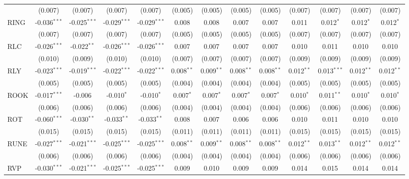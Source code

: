 \begin{table}[!htbp]
\begin{tabular}{@{\extracolsep{5pt}}lcccccccccccc}
  & (0.007) & (0.007) & (0.007) & (0.007) & (0.005) & (0.005) & (0.005) & (0.005) & (0.007) & (0.007) & (0.007) & (0.007) \\
 RING & -0.036$^{***}$ & -0.025$^{***}$ & -0.029$^{***}$ & -0.029$^{***}$ & 0.008$^{}$ & 0.008$^{}$ & 0.007$^{}$ & 0.007$^{}$ & 0.011$^{}$ & 0.012$^{*}$ & 0.012$^{*}$ & 0.012$^{*}$ \\
  & (0.007) & (0.007) & (0.007) & (0.007) & (0.005) & (0.005) & (0.005) & (0.005) & (0.007) & (0.007) & (0.007) & (0.007) \\
 RLC & -0.026$^{***}$ & -0.022$^{**}$ & -0.026$^{***}$ & -0.026$^{***}$ & 0.007$^{}$ & 0.007$^{}$ & 0.007$^{}$ & 0.007$^{}$ & 0.010$^{}$ & 0.011$^{}$ & 0.010$^{}$ & 0.010$^{}$ \\
  & (0.010) & (0.009) & (0.010) & (0.010) & (0.007) & (0.007) & (0.007) & (0.007) & (0.009) & (0.009) & (0.009) & (0.009) \\
 RLY & -0.023$^{***}$ & -0.019$^{***}$ & -0.022$^{***}$ & -0.022$^{***}$ & 0.008$^{**}$ & 0.009$^{**}$ & 0.008$^{**}$ & 0.008$^{**}$ & 0.012$^{**}$ & 0.013$^{***}$ & 0.012$^{**}$ & 0.012$^{**}$ \\
  & (0.005) & (0.005) & (0.005) & (0.005) & (0.004) & (0.004) & (0.004) & (0.004) & (0.005) & (0.005) & (0.005) & (0.005) \\
 ROOK & -0.017$^{***}$ & -0.006$^{}$ & -0.010$^{*}$ & -0.010$^{*}$ & 0.007$^{*}$ & 0.007$^{*}$ & 0.007$^{*}$ & 0.007$^{*}$ & 0.010$^{*}$ & 0.011$^{**}$ & 0.010$^{*}$ & 0.010$^{*}$ \\
  & (0.006) & (0.006) & (0.006) & (0.006) & (0.004) & (0.004) & (0.004) & (0.004) & (0.006) & (0.006) & (0.006) & (0.006) \\
 ROT & -0.060$^{***}$ & -0.030$^{**}$ & -0.033$^{**}$ & -0.033$^{**}$ & 0.008$^{}$ & 0.007$^{}$ & 0.006$^{}$ & 0.006$^{}$ & 0.010$^{}$ & 0.011$^{}$ & 0.010$^{}$ & 0.010$^{}$ \\
  & (0.015) & (0.015) & (0.015) & (0.015) & (0.011) & (0.011) & (0.011) & (0.011) & (0.015) & (0.015) & (0.015) & (0.015) \\
 RUNE & -0.027$^{***}$ & -0.021$^{***}$ & -0.025$^{***}$ & -0.025$^{***}$ & 0.008$^{**}$ & 0.009$^{**}$ & 0.008$^{**}$ & 0.008$^{**}$ & 0.012$^{**}$ & 0.013$^{**}$ & 0.012$^{**}$ & 0.012$^{**}$ \\
  & (0.006) & (0.006) & (0.006) & (0.006) & (0.004) & (0.004) & (0.004) & (0.004) & (0.006) & (0.006) & (0.006) & (0.006) \\
 RVP & -0.030$^{***}$ & -0.021$^{***}$ & -0.025$^{***}$ & -0.025$^{***}$ & 0.009$^{}$ & 0.010$^{}$ & 0.009$^{}$ & 0.009$^{}$ & 0.014$^{}$ & 0.015$^{}$ & 0.014$^{}$ & 0.014$^{}$ \\

\end{tabular}
\end{table}
